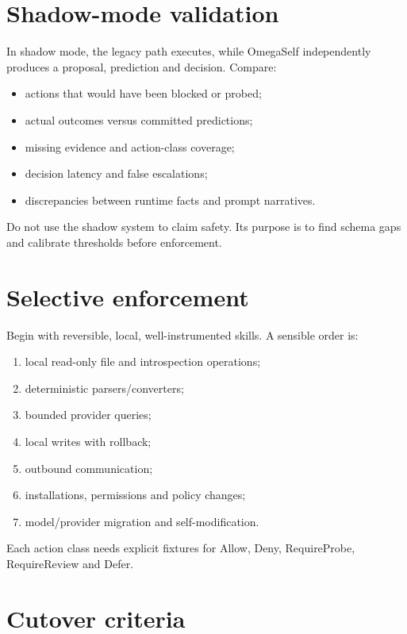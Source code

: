 \documentclass[11pt,oneside]{report}
\begin{document}
\section{Shadow-mode validation}

In shadow mode, the legacy path executes, while OmegaSelf independently produces a proposal, prediction and decision. Compare:

\begin{itemize}
  \item actions that would have been blocked or probed;
  \item actual outcomes versus committed predictions;
  \item missing evidence and action-class coverage;
  \item decision latency and false escalations;
  \item discrepancies between runtime facts and prompt narratives.
\end{itemize}

Do not use the shadow system to claim safety. Its purpose is to find schema gaps and calibrate thresholds before enforcement.

\section{Selective enforcement}

Begin with reversible, local, well-instrumented skills. A sensible order is:

\begin{enumerate}
  \item local read-only file and introspection operations;
  \item deterministic parsers/converters;
  \item bounded provider queries;
  \item local writes with rollback;
  \item outbound communication;
  \item installations, permissions and policy changes;
  \item model/provider migration and self-modification.
\end{enumerate}

Each action class needs explicit fixtures for Allow, Deny, RequireProbe, RequireReview and Defer.

\section{Cutover criteria}
\end{document}
